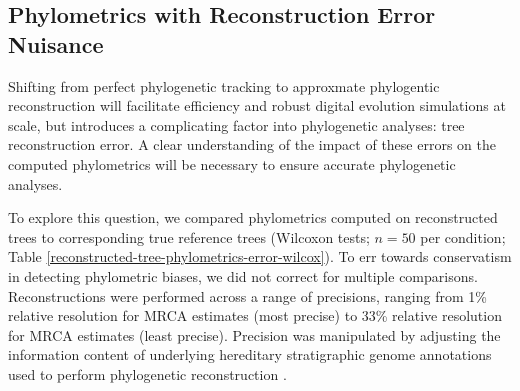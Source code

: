 





\subsection{Phylometrics with Reconstruction Error Nuisance}

Shifting from perfect phylogenetic tracking to approxmate phylogentic reconstruction will facilitate efficiency and robust digital evolution simulations at scale, but introduces a complicating factor into phylogenetic analyses: tree reconstruction error.
A clear understanding of the impact of these errors on the computed phylometrics will be necessary to ensure accurate phylogenetic analyses.

To explore this question, we compared phylometrics computed on reconstructed trees to corresponding true reference trees (Wilcoxon tests; $n=50$ per condition; Table \ref{reconstructed-tree-phylometrics-error-wilcox}).
To err towards conservatism in detecting phylometric biases, we did not correct for multiple comparisons.
Reconstructions were performed across a range of precisions, ranging from 1\% relative resolution for MRCA estimates (most precise) to 33\% relative resolution for MRCA estimates (least precise).
Precision was manipulated by adjusting the information content of underlying hereditary stratigraphic genome annotations used to perform phylogenetic reconstruction \citep{moreno2022hereditary}.

